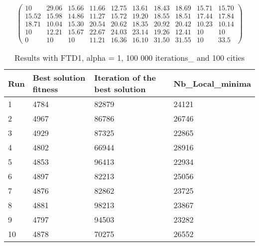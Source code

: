 \documentclass[12pt,oneside,a4paper]{article}
\begin{document}
\begin{equation}
  \tag{Mean Tabu Duration for each city (alpha = 5 and 50 cities)}
  \begin{pmatrix} 10 & 29.06 & 15.66 & 11.66 & 12.75 & 13.61 & 18.43 & 18.69 & 15.71 & 15.70 \\
    15.52 & 15.98 & 14.86 & 11.27 & 15.72 & 19.20 & 18.55 & 18.51 & 17.44 & 17.84 \\
    18.71 & 10.04 & 15.30 & 20.54 & 20.62 & 18.35 & 20.92 & 20.42 & 10.23 & 10.14 \\
    10 & 12.21 & 15.67 & 22.67 & 24.03 & 23.14 & 19.26 & 12.41 & 10 & 10 \\
    0 & 10 & 10 & 11.21 & 16.36 & 16.10 & 31.50 & 31.55 & 10 & 33.5 
  \end{pmatrix}
\end{equation}

\begin{table}[h]
  \centering
  \small
  \begin{tabular}{llll}
    \hline
    \multicolumn{1}{|l|}{\textbf{Run}}& \multicolumn{1}{l|}{\textbf{Best solution fitness}}& \multicolumn{1}{l|}{\textbf{Iteration of the best solution}}& \multicolumn{1}{l|}{\textbf{Nb\_Local\_minima}}\\ \hline
    \multicolumn{1}{|l|}{1} & \multicolumn{1}{l|}{4784}  & \multicolumn{1}{l|}{82879} & \multicolumn{1}{l|}{24121}  \\ \hline
    \multicolumn{1}{|l|}{2} & \multicolumn{1}{l|}{4967}  & \multicolumn{1}{l|}{86786} & \multicolumn{1}{l|}{26746}  \\ \hline         
    \multicolumn{1}{|l|}{3} & \multicolumn{1}{l|}{4929}  & \multicolumn{1}{l|}{87325}  & \multicolumn{1}{l|}{22865}  \\ \hline
    \multicolumn{1}{|l|}{4} & \multicolumn{1}{l|}{4802}  & \multicolumn{1}{l|}{66944}  & \multicolumn{1}{l|}{28916}  \\ \hline
    \multicolumn{1}{|l|}{5} & \multicolumn{1}{l|}{4853}  & \multicolumn{1}{l|}{96413}  & \multicolumn{1}{l|}{22934}  \\ \hline
    \multicolumn{1}{|l|}{6} & \multicolumn{1}{l|}{4897}  & \multicolumn{1}{l|}{82213}  & \multicolumn{1}{l|}{25056}  \\ \hline
    \multicolumn{1}{|l|}{7} & \multicolumn{1}{l|}{4876}  & \multicolumn{1}{l|}{82862}  & \multicolumn{1}{l|}{23725}  \\ \hline
    \multicolumn{1}{|l|}{8} & \multicolumn{1}{l|}{4881}  & \multicolumn{1}{l|}{98213} & \multicolumn{1}{l|}{23867}  \\ \hline
    \multicolumn{1}{|l|}{9} & \multicolumn{1}{l|}{4797}  & \multicolumn{1}{l|}{94503} & \multicolumn{1}{l|}{23282}  \\ \hline
    \multicolumn{1}{|l|}{10} & \multicolumn{1}{l|}{4878}  & \multicolumn{1}{l|}{70275} & \multicolumn{1}{l|}{26552}  \\ \hline
  \end{tabular}
  \caption{Results with FTD1, alpha = 1, 100 000 iterations\_ and 100 cities}
\end{table}
\end{document}
